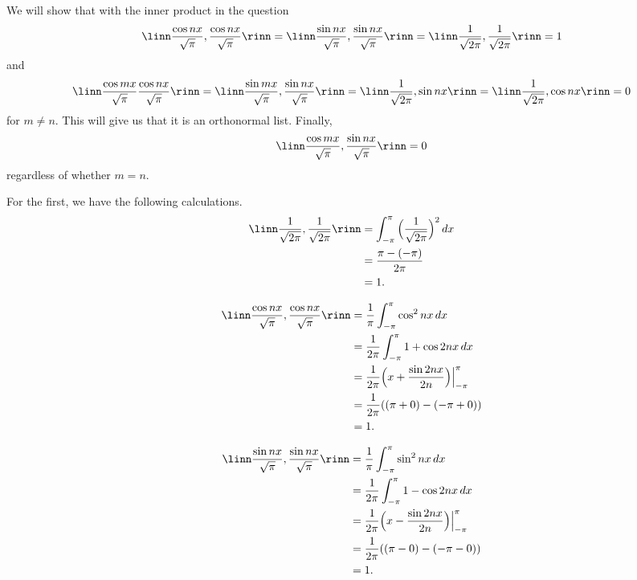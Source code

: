 \documentclass[12pt, letterpaper]{hmcpset}
\begin{document}
\begin{solution}
	We will show that with the inner product in the question
	\[
		\linn \frac{\cos{nx}}{\sqrt \pi}, \frac{\cos{nx}}{\sqrt \pi} \rinn = \linn \frac{\sin{nx}}{\sqrt \pi}, \frac{\sin{nx}}{\sqrt{\pi}} \rinn = \linn \frac{1}{\sqrt{2 \pi}}, \frac{1}{\sqrt{2 \pi}} \rinn = 1
	\]
	and
	\[
		\linn \frac{\cos{mx}}{\sqrt{\pi}} \frac{\cos{nx}}{\sqrt \pi} \rinn = \linn \frac{\sin{mx}}{\sqrt \pi}, \frac{\sin{nx}}{\sqrt \pi} \rinn = \linn \frac{1}{\sqrt{2 \pi}}, \sin{nx} \rinn = \linn \frac{1}{\sqrt{2 \pi}}, \cos{nx} \rinn = 0
	\]
	for $m \neq n$. This will give us that it is an orthonormal list.
	Finally,
	\[
		\linn \frac{\cos{mx}}{\sqrt{\pi}}, \frac{\sin{nx}}{\sqrt \pi} \rinn = 0
	\]
	regardless of whether $m = n$.

	For the first, we have the following calculations.
	\[
		\begin{split}
			\linn \frac{1}{\sqrt{2 \pi}}, \frac{1}{\sqrt{2 \pi}} \rinn & =\int_{-\pi}^\pi \Big ( \frac{1}{\sqrt{2 \pi}} \Big )^2 \, dx \\
										   & = \frac{\pi - (- \pi)}{2 \pi} \\ 
										   & = 1.
		\end{split}
	\]

	\[
		\begin{split}
			\linn \frac{\cos{nx}}{\sqrt \pi}, \frac{\cos{nx}}{\sqrt \pi} \rinn & = \frac{1}{\pi}\int_{-\pi}^\pi \cos^2{nx} \, dx \\
						       & = \frac{1}{2 \pi} \int_{-\pi}^\pi 1 + \cos{2nx} \, dx \\ 
						       & = \frac{1}{2 \pi} \Big ( x + \frac{\sin{2nx}}{2n} \Big ) \Big |_{-\pi}^{\pi} \\ 
						       & = \frac{1}{2 \pi} ((\pi + 0) - (-\pi + 0) ) \\
						       & = 1.
		\end{split}
	\]

	\[
		\begin{split}
			\linn \frac{\sin{nx}}{\sqrt \pi}, \frac{\sin{nx}}{\sqrt \pi} \rinn & = \frac{1}{\pi} \int_{-\pi}^{\pi} \sin^2{nx} \, dx \\
											   & = \frac{1}{2 \pi} \int_{- \pi}^\pi 1 - \cos{2nx} \, dx \\
											   & = \frac{1}{2 \pi} \Big ( x - \frac{\sin{2nx}}{2n} \Big ) \Big |_{-\pi}^\pi \\
											   & = \frac{1}{2 \pi} ((\pi - 0) - (-\pi - 0)) \\
											   & = 1.
		\end{split}
	\]


\end{solution}
\end{document}

